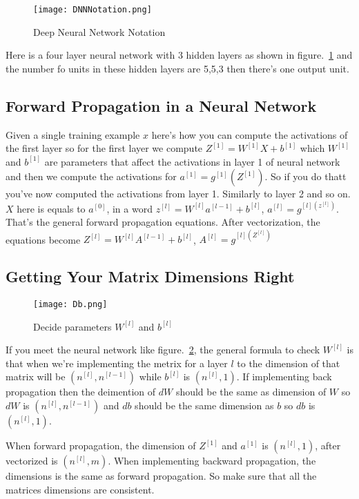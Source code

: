 \documentclass[a4paper]{article}
\begin{document}
\begin{figure}[!htp]
\begin{center}
   \texttt{[image: DNNNotation.png]}
\end{center}
   \caption{Deep Neural Network Notation~\cite{mooc.com,Coursera.org}}
\label{fig:DNNNotation}
\end{figure}

Here is a four layer neural network with 3 hidden layers as shown in figure.~\ref{fig:DNNNotation} and the number fo units in these hidden layers are 5,5,3 then there's one output unit.


\subsection{Forward Propagation in a Neural Network}
Given a single training example $x$ here's how you can compute the activations of the first layer so for the first layer we compute $Z^{[1]}=W^{[1]}X+b^{[1]}$ which $W^{[1]}$ and $b^{[1]}$ are parameters that affect the activations in layer 1 of neural network and then we compute the activations for $a^{[1]}=g^{[1]}(Z^{[1]})$. So if you do thatt you've now computed the activations from layer 1. Similarly to layer 2 and so on. $X$ here is equals to $a^{[0]}$, in a word $z^{[l]}=W^{[l]}a^{[l-1]}+b^{[l]}$, $a^{[l]}=g^{[l](z^{[l]})}$. That's the general forward propagation equations. After vectorization, the equations become $Z^{[l]}=W^{[l]}A^{[l-1]}+b^{[l]}$, $A^{[l]}=g^{[l](Z^{[l]})}$


\subsection{Getting Your Matrix Dimensions Right}

\begin{figure}[!htp]
\begin{center}
   \texttt{[image: Db.png]}
\end{center}
   \caption{Decide parameters $W^{[l]}$ and $b^{[l]}$~\cite{mooc.com,Coursera.org}}
\label{fig:Db}
\end{figure}

If you meet the neural network like figure.~\ref{fig:Db}, the general formula to check $W^{[l]}$ is that when we're implementing the metrix for a layer $l$ to the dimension of that matrix will be $(n^{[l]},n^{[l-1]})$ while $b^{[l]}$ is $(n^{[l]},1)$. If implementing back propagation then the deimention of $dW$ should be the same as dimension of $W$ so $dW$ is $(n^{[l]},n^{[l-1]})$ and $db$ should be the same dimension as $b$ so $db$ is $(n^{[l]},1)$.\par
When forward propagation, the dimension of $Z^{[1]}$ and $a^{[1]}$ is $(n^{[l]},1)$, after vectorized is $(n^{[l]},m)$. When  implementing backward propagation, the dimensions is the same as forward propagation. So make sure that all the matrices dimensions are consistent.
\end{document}

